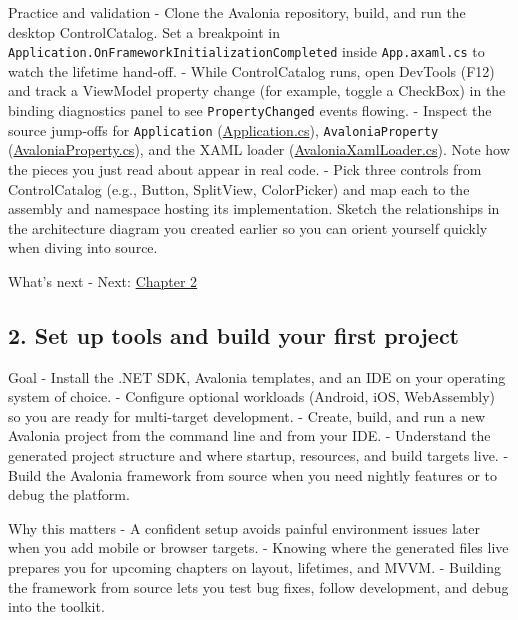 Practice and validation - Clone the Avalonia repository, build, and run
the desktop ControlCatalog. Set a breakpoint in
\passthrough{\lstinline!Application.OnFrameworkInitializationCompleted!}
inside \passthrough{\lstinline!App.axaml.cs!} to watch the lifetime
hand-off. - While ControlCatalog runs, open DevTools (F12) and track a
ViewModel property change (for example, toggle a CheckBox) in the
binding diagnostics panel to see
\passthrough{\lstinline!PropertyChanged!} events flowing. - Inspect the
source jump-offs for \passthrough{\lstinline!Application!}
(\href{https://github.com/AvaloniaUI/Avalonia/blob/master/src/Avalonia.Controls/Application.cs}{Application.cs}),
\passthrough{\lstinline!AvaloniaProperty!}
(\href{https://github.com/AvaloniaUI/Avalonia/blob/master/src/Avalonia.Base/AvaloniaProperty.cs}{AvaloniaProperty.cs}),
and the XAML loader
(\href{https://github.com/AvaloniaUI/Avalonia/blob/master/src/Avalonia.Markup.Xaml/AvaloniaXamlLoader.cs}{AvaloniaXamlLoader.cs}).
Note how the pieces you just read about appear in real code. - Pick
three controls from ControlCatalog (e.g., Button, SplitView,
ColorPicker) and map each to the assembly and namespace hosting its
implementation. Sketch the relationships in the architecture diagram you
created earlier so you can orient yourself quickly when diving into
source.

What's next - Next: \href{Chapter02.md}{Chapter 2}

\newpage

\subsection{2. Set up tools and build your first
project}\label{set-up-tools-and-build-your-first-project}

Goal - Install the .NET SDK, Avalonia templates, and an IDE on your
operating system of choice. - Configure optional workloads (Android,
iOS, WebAssembly) so you are ready for multi-target development. -
Create, build, and run a new Avalonia project from the command line and
from your IDE. - Understand the generated project structure and where
startup, resources, and build targets live. - Build the Avalonia
framework from source when you need nightly features or to debug the
platform.

Why this matters - A confident setup avoids painful environment issues
later when you add mobile or browser targets. - Knowing where the
generated files live prepares you for upcoming chapters on layout,
lifetimes, and MVVM. - Building the framework from source lets you test
bug fixes, follow development, and debug into the toolkit.

